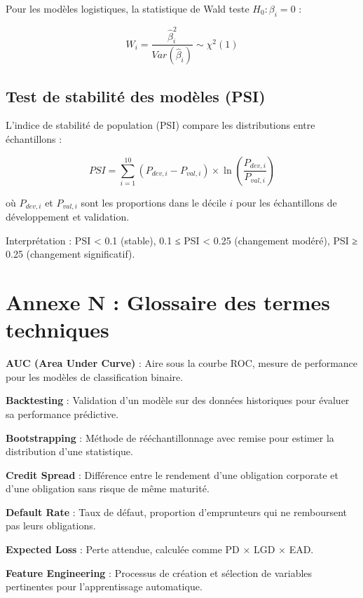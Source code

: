 \begin{table}[h]
\begin{table}[h]
\begin{table}[h]
\begin{table}[h]
\begin{table}[h]
\begin{table}[h]
\begin{table}[h]
Pour les modèles logistiques, la statistique de Wald teste $H_0: \beta_i = 0$ :

\begin{equation}
W_i = \frac{\hat{\beta}_i^2}{Var(\hat{\beta}_i)} \sim \chi^2(1)
\end{equation}

\subsection{Test de stabilité des modèles (PSI)}

L'indice de stabilité de population (PSI) compare les distributions entre échantillons :

\begin{equation}
PSI = \sum_{i=1}^{10} (P_{dev,i} - P_{val,i}) \times \ln\left(\frac{P_{dev,i}}{P_{val,i}}\right)
\end{equation}

où $P_{dev,i}$ et $P_{val,i}$ sont les proportions dans le décile $i$ pour les échantillons de développement et validation.

Interprétation : PSI < 0.1 (stable), 0.1 ≤ PSI < 0.25 (changement modéré), PSI ≥ 0.25 (changement significatif).

\section{Annexe N : Glossaire des termes techniques}

\textbf{AUC (Area Under Curve)} : Aire sous la courbe ROC, mesure de performance pour les modèles de classification binaire.

\textbf{Backtesting} : Validation d'un modèle sur des données historiques pour évaluer sa performance prédictive.

\textbf{Bootstrapping} : Méthode de rééchantillonnage avec remise pour estimer la distribution d'une statistique.

\textbf{Credit Spread} : Différence entre le rendement d'une obligation corporate et d'une obligation sans risque de même maturité.

\textbf{Default Rate} : Taux de défaut, proportion d'emprunteurs qui ne remboursent pas leurs obligations.

\textbf{Expected Loss} : Perte attendue, calculée comme PD × LGD × EAD.

\textbf{Feature Engineering} : Processus de création et sélection de variables pertinentes pour l'apprentissage automatique.


\end{table}
\end{table}
\end{table}
\end{table}
\end{table}
\end{table}
\end{table}
